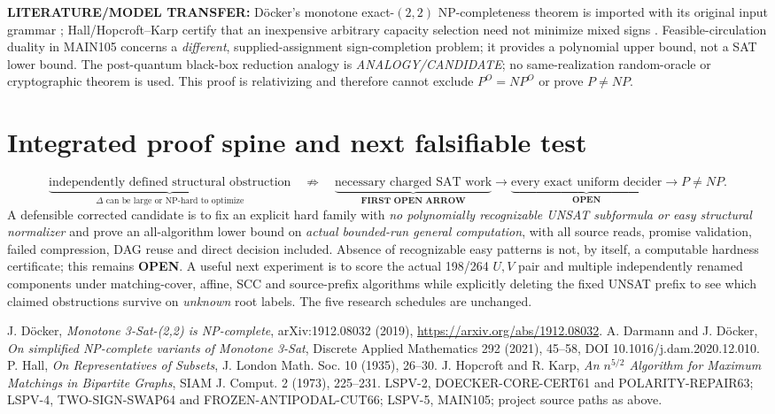 \documentclass[11pt]{article}
\begin{document}
\textbf{LITERATURE/MODEL TRANSFER:} D\"ocker's monotone exact-\((2,2)\) NP-completeness theorem is imported with its original input grammar \cite{Docker}; Hall/Hopcroft--Karp certify that an inexpensive arbitrary capacity selection need not minimize mixed signs \cite{Hall,HK}. Feasible-circulation duality in MAIN105 concerns a \emph{different}, supplied-assignment sign-completion problem; it provides a polynomial upper bound, not a SAT lower bound. The post-quantum black-box reduction analogy is \emph{ANALOGY/CANDIDATE}; no same-realization random-oracle or cryptographic theorem is used. This proof is relativizing and therefore cannot exclude \(P^O=NP^O\) or prove \(P\ne NP\).

\section{Integrated proof spine and next falsifiable test}
\[
\underbrace{\text{independently defined structural obstruction}}_{\Delta\text{ can be large or NP-hard to optimize}}
\quad\not\Longrightarrow\quad
\underbrace{\text{necessary charged SAT work}}_{\textbf{FIRST OPEN ARROW}}
\longrightarrow
\underbrace{\text{every exact uniform decider}}_{\textbf{OPEN}}
\longrightarrow P\ne NP.
\]
A defensible corrected candidate is to fix an explicit hard family with \emph{no polynomially recognizable UNSAT subformula or easy structural normalizer} and prove an all-algorithm lower bound on \emph{actual bounded-run general computation}, with all source reads, promise validation, failed compression, DAG reuse and direct decision included. Absence of recognizable easy patterns is not, by itself, a computable hardness certificate; this remains \textbf{OPEN}. A useful next experiment is to score the actual 198/264 \(U,V\) pair and multiple independently renamed components under matching-cover, affine, SCC and source-prefix algorithms while explicitly deleting the fixed UNSAT prefix to see which claimed obstructions survive on \emph{unknown} root labels. The five research schedules are unchanged.

\begin{thebibliography}{9}
 J. D\"ocker, \emph{Monotone 3-Sat-(2,2) is NP-complete}, arXiv:1912.08032 (2019), \url{https://arxiv.org/abs/1912.08032}.
 A. Darmann and J. D\"ocker, \emph{On simplified NP-complete variants of Monotone 3-Sat}, Discrete Applied Mathematics 292 (2021), 45--58, DOI 10.1016/j.dam.2020.12.010.
 P. Hall, \emph{On Representatives of Subsets}, J. London Math. Soc. 10 (1935), 26--30.
 J. Hopcroft and R. Karp, \emph{An \(n^{5/2}\) Algorithm for Maximum Matchings in Bipartite Graphs}, SIAM J. Comput. 2 (1973), 225--231.
 LSPV-2, DOECKER-CORE-CERT61 and POLARITY-REPAIR63; LSPV-4, TWO-SIGN-SWAP64 and FROZEN-ANTIPODAL-CUT66; LSPV-5, MAIN105; project source paths as above.
\end{thebibliography}
\end{document}
